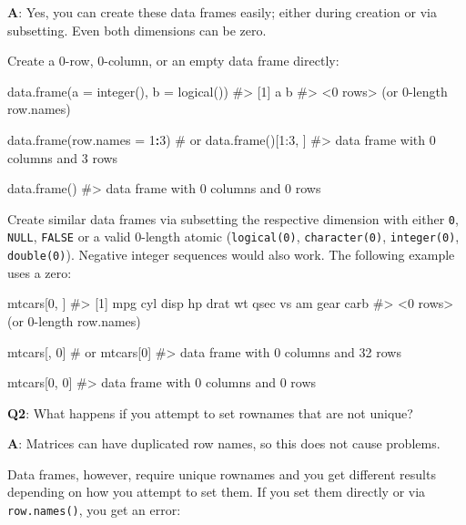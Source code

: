 \documentclass[
]{krantz}
\makeatletter
\newenvironment{Shaded}{\begin{snugshade}}{\end{snugshade}}
\newcommand{\CommentTok}[1]{\textcolor[rgb]{0.56,0.35,0.01}{\textit{#1}}}
\newcommand{\DataTypeTok}[1]{\textcolor[rgb]{0.13,0.29,0.53}{#1}}
\newcommand{\DecValTok}[1]{\textcolor[rgb]{0.00,0.00,0.81}{#1}}
\newcommand{\KeywordTok}[1]{\textcolor[rgb]{0.13,0.29,0.53}{\textbf{#1}}}
\newcommand{\NormalTok}[1]{#1}
\newcommand{\OperatorTok}[1]{\textcolor[rgb]{0.81,0.36,0.00}{\textbf{#1}}}
\newenvironment{kframe}{%
\medskip{}
\setlength{\fboxsep}{.8em}
 \def\at@end@of@kframe{}%
 \ifinner\ifhmode%
  \def\at@end@of@kframe{\end{minipage}}%
  \begin{minipage}{\columnwidth}%
 \fi\fi%
 \def\FrameCommand##1{\hskip\@totalleftmargin \hskip-\fboxsep
 \colorbox{shadecolor}{##1}\hskip-\fboxsep
     \hskip-\linewidth \hskip-\@totalleftmargin \hskip\columnwidth}%
 \MakeFramed {\advance\hsize-\width
   \@totalleftmargin\z@ \linewidth\hsize
   \@setminipage}}%
 {\par\unskip\endMakeFramed%
 \at@end@of@kframe}
\renewenvironment{Shaded}{\begin{kframe}}{\end{kframe}}
\renewcommand{\KeywordTok} [1]{\textcolor[rgb]{0.00,0.44,0.13}{{#1}}}
\renewcommand{\DataTypeTok}[1]{\textcolor[rgb]{0.56,0.13,0.00}{{#1}}}
\renewcommand{\DecValTok}  [1]{\textcolor[rgb]{0.25,0.63,0.44}{{#1}}}
\renewcommand{\CommentTok} [1]{\textcolor[rgb]{0.38,0.63,0.69}{{#1}}}
\renewcommand{\NormalTok}  [1]{{#1}}
\makeatother
\begin{document}
\textbf{{A}}: Yes, you can create these data frames easily; either during creation or via subsetting. Even both dimensions can be zero.

Create a 0-row, 0-column, or an empty data frame directly:

\begin{Shaded}
\begin{Highlighting}[]
\KeywordTok{data.frame}\NormalTok{(}\DataTypeTok{a =} \KeywordTok{integer}\NormalTok{(), }\DataTypeTok{b =} \KeywordTok{logical}\NormalTok{())}
\CommentTok{#> [1] a b}
\CommentTok{#> <0 rows> (or 0-length row.names)}

\KeywordTok{data.frame}\NormalTok{(}\DataTypeTok{row.names =} \DecValTok{1}\OperatorTok{:}\DecValTok{3}\NormalTok{)  }\CommentTok{# or data.frame()[1:3, ]}
\CommentTok{#> data frame with 0 columns and 3 rows}

\KeywordTok{data.frame}\NormalTok{()}
\CommentTok{#> data frame with 0 columns and 0 rows}
\end{Highlighting}
\end{Shaded}

Create similar data frames via subsetting the respective dimension with either \texttt{0}, \texttt{NULL}, \texttt{FALSE} or a valid 0-length atomic (\texttt{logical(0)}, \texttt{character(0)}, \texttt{integer(0)}, \texttt{double(0)}). Negative integer sequences would also work. The following example uses a zero:

\begin{Shaded}
\begin{Highlighting}[]
\NormalTok{mtcars[}\DecValTok{0}\NormalTok{, ]}
\CommentTok{#>  [1] mpg  cyl  disp hp   drat wt   qsec vs   am   gear carb}
\CommentTok{#> <0 rows> (or 0-length row.names)}

\NormalTok{mtcars[, }\DecValTok{0}\NormalTok{] }\CommentTok{# or mtcars[0]}
\CommentTok{#> data frame with 0 columns and 32 rows}

\NormalTok{mtcars[}\DecValTok{0}\NormalTok{, }\DecValTok{0}\NormalTok{]}
\CommentTok{#> data frame with 0 columns and 0 rows}
\end{Highlighting}
\end{Shaded}

\textbf{{Q2}}: What happens if you attempt to set rownames that are not unique?

\textbf{{A}}: Matrices can have duplicated row names, so this does not cause problems.

Data frames, however, require unique rownames and you get different results depending on how you attempt to set them. If you set them directly or via \texttt{row.names()}, you
get an error:
\end{document}
